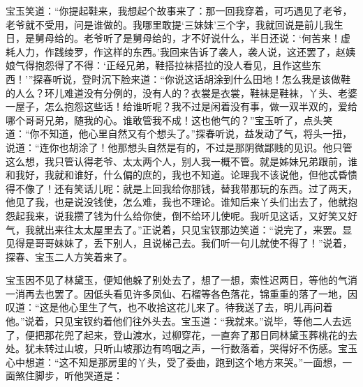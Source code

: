 \documentclass[12pt,oneside]{book}
\begin{document}
宝玉笑道：“你提起鞋来，我想起个故事来了：那一回我穿着，可巧遇见了老爷，老爷就不受用，问是谁做的。我哪里敢提‘三妹妹’三个字，我就回说是前儿我生日，是舅母给的。老爷听了是舅母给的，才不好说什么，半日还说：‘何苦来！虚耗人力，作践绫罗，作这样的东西。’我回来告诉了袭人，袭人说，这还罢了，赵姨娘气得抱怨得了不得：‘正经兄弟，鞋搭拉袜搭拉的没人看见，且作这些东西！’”探春听说，登时沉下脸来道：“你说这话胡涂到什么田地！怎么我是该做鞋的人么？环儿难道没有分例的，没有人的？衣裳是衣裳，鞋袜是鞋袜，丫头、老婆一屋子，怎么抱怨这些话！给谁听呢？我不过是闲着没有事，做一双半双的，爱给哪个哥哥兄弟，随我的心。谁敢管我不成！这也他气的？”宝玉听了，点头笑道：“你不知道，他心里自然又有个想头了。”探春听说，益发动了气，将头一扭，说道：“连你也胡涂了！他那想头自然是有的，不过是那阴微鄙贱的见识。他只管这么想，我只管认得老爷、太太两个人，别人我一概不管。就是姊妹兄弟跟前，谁和我好，我就和谁好，什么偏的庶的，我也不知道。论理我不该说他，但他忒昏愦得不像了！还有笑话儿呢：就是上回我给你那钱，替我带那玩的东西。过了两天，他见了我，也是说没钱使，怎么难，我也不理论。谁知后来丫头们出去了，他就抱怨起我来，说我攒了钱为什么给你使，倒不给环儿使呢。我听见这话，又好笑又好气，我就出来往太太屋里去了。”正说着，只见宝钗那边笑道：“说完了，来罢。显见得是哥哥妹妹了，丢下别人，且说梯己去。我们听一句儿就使不得了！”说着，探春、宝玉二人方笑着来了。

宝玉因不见了林黛玉，便知他躲了别处去了，想了一想，索性迟两日，等他的气消一消再去也罢了。因低头看见许多凤仙、石榴等各色落花，锦重重的落了一地，因叹道：“这是他心里生了气，也不收拾这花儿来了。待我送了去，明儿再问着他。”说着，只见宝钗约着他们往外头去。宝玉道：“我就来。”说毕，等他二人去远了，便把那花兜了起来，登山渡水，过柳穿花，一直奔了那日同林黛玉葬桃花的去处。犹未转过山坡，只听山坡那边有呜咽之声，一行数落着，哭得好不伤感。宝玉心中想道：“这不知是那房里的丫头，受了委曲，跑到这个地方来哭。”一面想，一面煞住脚步，听他哭道是：
\end{document}
